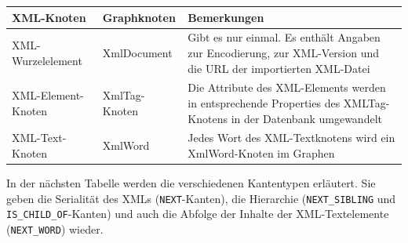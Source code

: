 \documentclass[ngerman,]{scrreprt}
\begin{document}
\begin{longtable}[]{@{}lll@{}}
\toprule
\begin{minipage}[b]{0.24\columnwidth}\raggedright\strut
XML-Knoten\strut
\end{minipage} & \begin{minipage}[b]{0.23\columnwidth}\raggedright\strut
Graphknoten\strut
\end{minipage} & \begin{minipage}[b]{0.44\columnwidth}\raggedright\strut
Bemerkungen\strut
\end{minipage}\tabularnewline
\midrule
\endhead
\begin{minipage}[t]{0.24\columnwidth}\raggedright\strut
XML-Wurzelelement\strut
\end{minipage} & \begin{minipage}[t]{0.23\columnwidth}\raggedright\strut
XmlDocument\strut
\end{minipage} & \begin{minipage}[t]{0.44\columnwidth}\raggedright\strut
Gibt es nur einmal. Es enthält Angaben zur Encodierung, zur XML-Version und die URL der importierten XML-Datei\strut
\end{minipage}\tabularnewline
\begin{minipage}[t]{0.24\columnwidth}\raggedright\strut
XML-Element-Knoten\strut
\end{minipage} & \begin{minipage}[t]{0.23\columnwidth}\raggedright\strut
XmlTag-Knoten\strut
\end{minipage} & \begin{minipage}[t]{0.44\columnwidth}\raggedright\strut
Die Attribute des XML-Elements werden in entsprechende Properties des XMLTag-Knotens in der Datenbank umgewandelt\strut
\end{minipage}\tabularnewline
\begin{minipage}[t]{0.24\columnwidth}\raggedright\strut
XML-Text-Knoten\strut
\end{minipage} & \begin{minipage}[t]{0.23\columnwidth}\raggedright\strut
XmlWord\strut
\end{minipage} & \begin{minipage}[t]{0.44\columnwidth}\raggedright\strut
Jedes Wort des XML-Textknotens wird ein XmlWord-Knoten im Graphen\strut
\end{minipage}\tabularnewline
\bottomrule
\end{longtable}

In der nächsten Tabelle werden die verschiedenen Kantentypen erläutert. Sie geben die Serialität des XMLs (\texttt{NEXT}-Kanten), die Hierarchie (\texttt{NEXT\_SIBLING} und \texttt{IS\_CHILD\_OF}-Kanten) und auch die Abfolge der Inhalte der XML-Textelemente (\texttt{NEXT\_WORD}) wieder.
\end{document}
